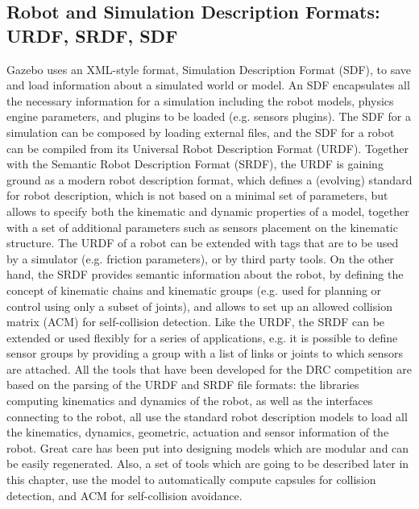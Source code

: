 \subsection{Robot and Simulation Description Formats: URDF, SRDF, SDF}
Gazebo uses an XML-style format, Simulation Description Format (SDF), to save and load information about a simulated world or model. An SDF encapsulates all the necessary information for a simulation including the robot models, physics engine parameters, and plugins to be loaded (e.g. sensors plugins). The SDF for a simulation can be composed by loading external files, and the SDF for a robot can be compiled from its Universal Robot Description Format (URDF).
Together with the Semantic Robot Description Format (SRDF), the URDF is gaining ground as a modern robot description format, which defines a (evolving) standard for robot description, which is not based on a minimal set of parameters, but allows to specify both the kinematic and dynamic properties of a model, together with a set of additional parameters such as sensors placement on the kinematic structure. The URDF of a robot can be extended with tags that are to be used by a simulator (e.g. friction parameters), or by third party tools.
On the other hand, the SRDF provides semantic information about the robot, by defining the concept of kinematic chains and kinematic groups (e.g. used for planning or control using only a subset of joints), and allows to set up an allowed collision matrix (ACM) for self-collision detection. Like the URDF, the SRDF can be extended or used flexibly for a series of applications, e.g. it is possible to define sensor groups by providing a group with a list of links or joints to which sensors are attached.
All the tools that have been developed for the DRC competition are based on the parsing of the URDF and SRDF file formats: the libraries computing kinematics and dynamics of the robot, as well as the interfaces connecting to the robot, all use the standard robot description models to load all the kinematics, dynamics, geometric, actuation and sensor information of the robot.
Great care has been put into designing models which are modular and can be easily regenerated. Also, a set of tools which are going to be described later in this chapter, use the model to automatically compute capsules for collision detection, and ACM for self-collision avoidance.

